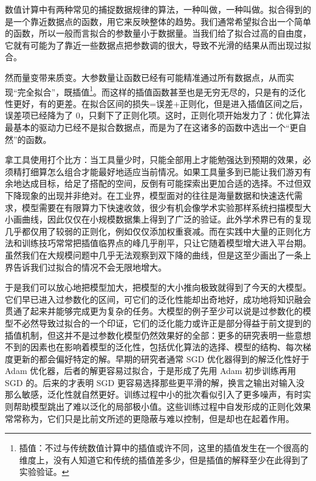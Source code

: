数值计算中有两种常见的捕捉数据规律的算法，一种叫做，一种叫做。拟合得到的是一个靠近数据点的函数，用它来反映整体的趋势。我们通常希望拟合出一个简单的函数，所以一般而言拟合的参数量小于数据量。当我们给了拟合过高的自由度，它就有可能为了靠近一些数据点把参数调的很大，导致不光滑的结果从而出现过拟合。

然而量变带来质变。大参数量让函数已经有可能精准通过所有数据点，从而实现“完全拟合”，既插值\footnote{插值：不过与传统数值计算中的插值或许不同，这里的插值发生在一个很高的维度上，没有人知道它和传统的插值差多少，但是插值的解释至少在此得到了实验验证。}。而这样的插值函数甚至也是无穷无尽的，只是有的泛化性更好，有的更差。在拟合区间的损失=误差+正则化，但是进入插值区间之后，误差项已经降为了 0，只剩下了正则化项。这时，正则化项开始发力了：优化算法最基本的驱动力已经不是拟合数据点，而是为了在这诸多的函数中选出一个“更自然”的函数。

拿工具使用打个比方：当工具量少时，只能全部用上才能勉强达到预期的效果，必须精打细算怎么组合才能最好地适应当前情况。如果工具量多到已能让我们游刃有余地达成目标，给足了搭配的空间，反倒有可能探索出更加合适的选择。不过但双下降现象的出现并非绝对。在工业界，模型面对的往往是海量数据和快速迭代需求，模型需要在有限算力下快速收敛，很少有机会像学术实验那样系统扫描模型大小画曲线，因此仅仅在小规模数据集上得到了广泛的验证。此外学术界已有的复现几乎都仅用了较弱的正则化，例如仅仅添加权重衰减。而在实践中大量的正则化方法和训练技巧常常把插值临界点的峰几乎削平，只让它随着模型增大进入平台期。虽然我们在大规模问题中几乎无法观察到双下降的曲线，但是这至少画出了一条上界告诉我们过拟合的情况不会无限地增大。

于是我们可以放心地把模型加大，把模型的大小推向极致就得到了今天的大模型。它们早已进入过参数化的区间，可它们的泛化性能却出奇地好，成功地将知识融会贯通了起来并能够完成更为复杂的任务。大模型的例子至少可以说是过参数化的模型不必然导致过拟合的一个印证，它们的泛化能力或许正是部分得益于前文提到的插值机制，但这并不是过参数化模型仍然效果好的全部：更多的研究表明一些意想不到的因素也在影响着模型的泛化性，包括优化算法的选择、模型的结构、每次梯度更新的都会偏好特定的解。早期的研究者通常 SGD 优化器得到的解泛化性好于 Adam 优化器，后者的解更容易过拟合，于是形成了先用 Adam 初步训练再用 SGD 的。后来的才表明 SGD 更容易选择那些更平滑的解，换言之输出对输入没那么敏感，泛化性就自然更好。训练过程中小的批次看似引入了更多噪声，有时实则帮助模型跳出了难以泛化的局部极小值。这些训练过程中自发形成的正则化效果常常称为，它们只是比前文所述的更隐蔽与难以控制，但是却也在起着作用。


